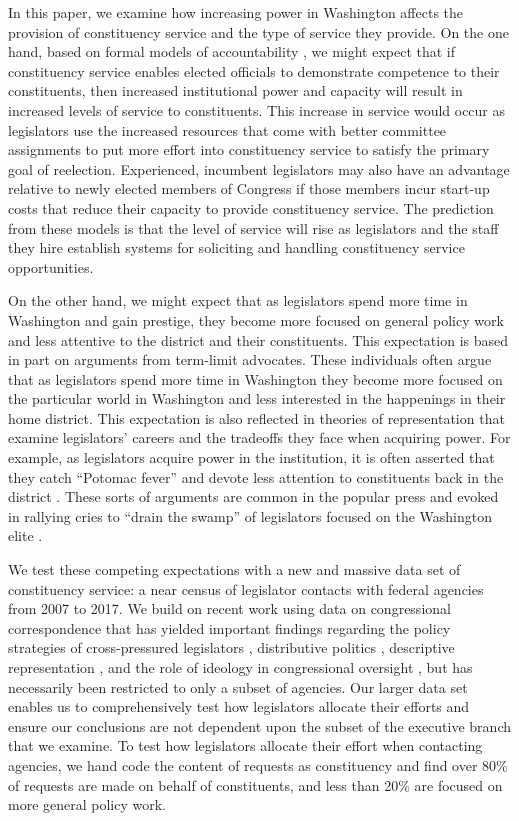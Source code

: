 \documentclass[12pt]{article}
\begin{document}
In this paper, we examine how increasing power in Washington affects the provision of constituency service and the type of service they provide.  On the one hand, based on formal models of accountability \citep{AshworthBuenodeMesquita2006}, we might expect that if constituency service enables elected officials to demonstrate competence to their constituents, then increased institutional power and capacity will result in increased levels of service to constituents. This increase in service would occur as legislators use the increased resources that come with better committee assignments to put more effort into constituency service to satisfy the primary goal of reelection. Experienced, incumbent legislators may also have an advantage relative to newly elected members of Congress if those members incur start-up costs that reduce their capacity to provide constituency service. The prediction from these models is that the level of service will rise as legislators and the staff they hire establish systems for soliciting and handling constituency service opportunities.

On the other hand, we might expect that as legislators spend more time in Washington and gain prestige, they become more focused on general policy work and less attentive to the district and their constituents.  This expectation is based in part on arguments from term-limit advocates.  These individuals often argue that as legislators spend more time in Washington they become more focused on the particular world in Washington and less interested in the happenings in their home district.  This expectation is also reflected in theories of representation that examine legislators' careers and the tradeoffs they face when acquiring power.  For example, as legislators acquire power in the institution, it is often asserted that they catch ``Potomac fever'' and devote less attention to constituents back in the district \citep{Fenno1978}. These sorts of arguments are common in the popular press \citep{Edwards2005} and evoked in rallying cries to ``drain the swamp'' of legislators focused on the Washington elite \citep{Rosenblatt2016}. 

We test these competing expectations with a new and massive data set of constituency service: a near census of legislator contacts with federal agencies from 2007 to 2017. We build on recent work using data on congressional correspondence that has yielded important findings regarding the policy strategies of cross-pressured legislators \citep{Ritchie2017}, distributive politics \citep{MillsKalafHuges2015}, descriptive representation \citep{LowandeRitchieLauterbach2018}, and the role of ideology in congressional oversight \citep{Lowande2018JOP}, but has necessarily been restricted to only a subset of agencies. Our larger data set enables us to comprehensively test how legislators allocate their efforts and ensure our conclusions are not dependent upon the subset of the executive branch that we examine. To test how legislators allocate their effort when contacting agencies, we hand code the content of requests as constituency and find over 80\% of requests are made on behalf of constituents, and less than 20\% are focused on more general policy work. 
\end{document}
